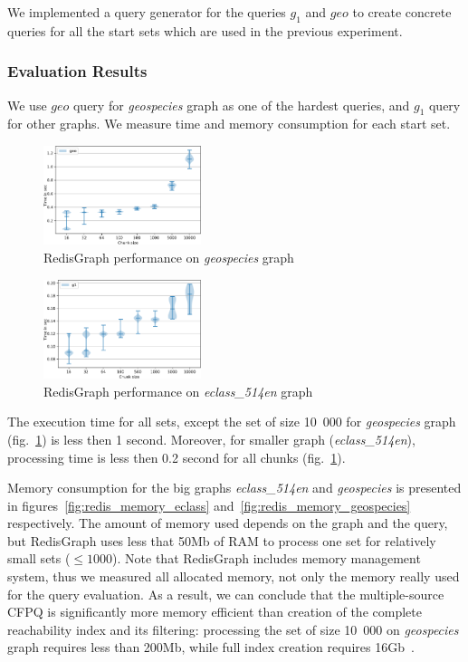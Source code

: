 We implemented a query generator for the queries $g_1$ and $geo$ to create concrete queries for all the start sets which are used in the previous experiment.


\subsubsection{Evaluation Results}

We use $geo$ query for \textit{geospecies} graph as one of the hardest queries, and $g_1$ query for other graphs.
We measure time and memory consumption for each start set.

\begin{figure}[h]
\centering
\includegraphics[width=0.41\textwidth]{data/raw_redis/geospecies.pdf}
\caption{RedisGraph performance on \textit{geospecies} graph}
\label{fig:redis_geospecies_all}
\end{figure}

\begin{figure}[h]
\centering
\includegraphics[width=0.41\textwidth]{data/raw_redis/eclass_514en.pdf}
\caption{RedisGraph performance on \textit{eclass\_514en} graph}
\label{fig:redis_eclass_all}
\end{figure}

The execution time for all sets, except the set of size 10~000 for \textit{geospecies} graph (fig.~\ref{fig:redis_geospecies_all}) is less then 1 second.
Moreover, for smaller graph (\textit{eclass\_514en}), processing time is less then 0.2 second for all chunks (fig.~\ref{fig:redis_geospecies_all}).

Memory consumption for the big graphs \textit{eclass\_514en} and \textit{geospecies} is presented in figures~\ref{fig:redis_memory_eclass} and~\ref{fig:redis_memory_geospecies} respectively.
The amount of memory used depends on the graph and the query, but RedisGraph uses less that 50Mb of RAM to process one set for relatively small sets ($\leq 1000$).
Note that RedisGraph includes memory management system, thus we measured all allocated memory, not only the memory really used for the query evaluation.
As a result, we can conclude that the multiple-source CFPQ is significantly more memory efficient than creation of the complete reachability index and its filtering: processing the set of size 10~000 on \textit{geospecies} graph requires less than 200Mb, while full index creation requires 16Gb~\cite{10.1145/3398682.3399163}.

